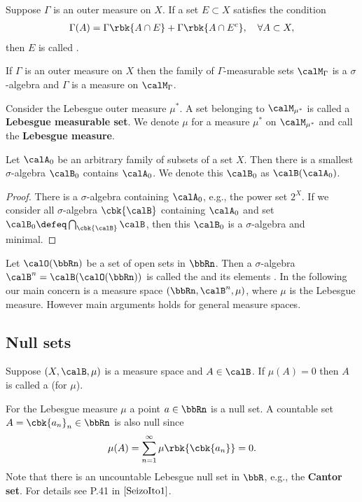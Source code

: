\documentclass[openany, a4paper, oneside]{jsbook}
\begin{document}
Suppose $\Gamma$ is an outer measure on $X$.
If a set $E \subset X$ satisfies the condition
\begin{align}
 \Gamma (A)
 =
 \Gamma \rbk{A \cap E} + \Gamma \rbk{A \cap E^{c}},
 \quad \forall A \subset X,
\end{align}
then $E$ is called .
\begin{thm}
 If $\Gamma$ is an outer measure on $X$ then the family of $\Gamma$-measurable sets $\calM_{\Gamma}$ is
 a $\sigma$-algebra and $\Gamma$ is a measure on $\calM_{\Gamma}$.
\end{thm}
Consider the Lebesgue outer measure $\mu^*$.
A set belonging to $\calM_{\mu^*}$ is called a \textbf{Lebesgue measurable set}.
We denote $\mu$ for a measure $\mu^*$ on $\calM_{\mu^*}$ and call the \textbf{Lebesgue measure}.
\begin{thm}
 Let $\calA_0$ be an arbitrary family of subsets of a set $X$.
 Then there is a smallest $\sigma$-algebra $\calB_0$ contains $\calA_0$.
 We denote this $\calB_0$ as $\calB (\calA_0)$.
\end{thm}
\begin{proof}
There is a $\sigma$-algebra containing $\calA_0$, e.g., the power set $2^X$.
If we consider all $\sigma$-algebra $\cbk{\calB}$ containing $\calA_0$ and
set $\calB_0 \defeq \bigcap_{\cbk{\calB}} \calB$,
then this $\calB_0$ is a $\sigma$-algebra and minimal.
\end{proof}

Let $\calO (\bbRn)$ be a set of open sets in $\bbRn$.
Then a $\sigma$-algebra $\calB^n = \calB (\calO (\bbRn))$ is called the 
and its elements .
In the following our main concern is a measure space $(\bbRn, \calB^n, \mu)$,
where $\mu$ is the Lebesgue measure.
However main arguments holds for general measure spaces.
\subsection{Null sets}

\begin{defn}
 Suppose $(X, \calB, \mu)$ is a measure space and $A \in \calB$.
 If $\mu (A) = 0$ then $A$ is called a  (for $\mu$).
\end{defn}
For the Lebesgue measure $\mu$ a point $a \in \bbRn$ is a null set.
A countable set $A = \cbk{a_n}_n \in \bbRn$ is also null since
\begin{align}
 \mu (A)
 =
 \sum_{n=1}^{\infty} \mu \rbk{\cbk{a_n}}
 = 0.
\end{align}
Note that there is an uncountable Lebesgue null set in $\bbR$, e.g., the \textbf{Cantor set}.
For details see P.41 in $\cite{SeizoIto1}$.
\end{document}
